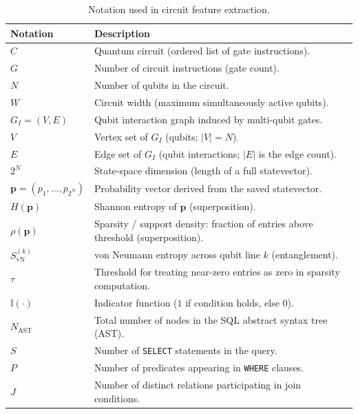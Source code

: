 \begin{table}[t]
  \caption{Notation used in circuit feature extraction.}
  \label{tab:notation}
  \centering
  \small
  \setlength{\tabcolsep}{3pt}
  \renewcommand{\arraystretch}{1.05}
  \begin{tabularx}{0.88\columnwidth}{@{}l>{\footnotesize}X@{}}
    \toprule
    \textbf{Notation} & \textbf{Description} \\
    \midrule
    $C$ & Quantum circuit (ordered list of gate instructions). \\
    $G$ & Number of circuit instructions (gate count). \\
    $N$ & Number of qubits in the circuit. \\
    $W$ & Circuit width (maximum simultaneously active qubits). \\
    $G_I=(V,E)$ & Qubit interaction graph induced by multi-qubit gates. \\
    $V$ & Vertex set of $G_I$ (qubits; $|V|=N$). \\
    $E$ & Edge set of $G_I$ (qubit interactions; $|E|$ is the edge count). \\
    $2^N$ & State-space dimension (length of a full statevector). \\
    $\mathbf{p}=(p_1,\ldots,p_{2^N})$ & Probability vector derived from the saved statevector. \\
    $H(\mathbf{p})$ & Shannon entropy of $\mathbf{p}$ (superposition). \\
    $\rho(\mathbf{p})$ & Sparsity / support density: fraction of entries above threshold (superposition). \\
    $S_{\mathrm{vN}}^{(k)}$ & von Neumann entropy across qubit line $k$ (entanglement). \\
    $\tau$ & Threshold for treating near-zero entries as zero in sparsity computation. \\
    $\mathbb{I}(\cdot)$ & Indicator function ($1$ if condition holds, else $0$). \\
    $N_{\mathrm{AST}}$ & Total number of nodes in the SQL abstract syntax tree (AST). \\
    $S$ & Number of \texttt{SELECT} statements in the query. \\
    $P$ & Number of predicates appearing in \texttt{WHERE} clauses. \\
    $J$ & Number of distinct relations participating in join conditions. \\
    \bottomrule
  \end{tabularx}
    \vspace{-0.4cm}
\end{table}




